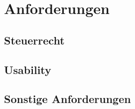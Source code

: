 
\section{Anforderungen} %
\label{sec:anforderungen}
\subsection{Steuerrecht} %
\label{sub:steuerrecht}

\subsection{Usability} %
\label{sub:usability}

\subsection{Sonstige Anforderungen} %
\label{sub:sonstige_anforderungen}



